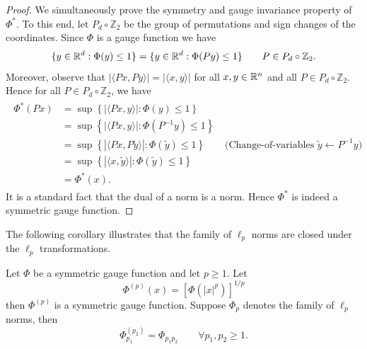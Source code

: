 \documentclass[sn-nature]{sn-jnl}%
\theoremstyle{thmstyleone}%
\theoremstyle{thmstyletwo}%
\theoremstyle{thmstylethree}%
\begin{document}
\begin{proof}
    We simultaneously prove the symmetry and gauge invariance property of $\Phi^*$. To this end, let $P_d \circ \mathbb{Z}_2$ be the group of permutations and sign changes of the coordinates.
    Since $\Phi$ is a gauge function we have
    \[
    \{y \in \mathbb{R}^d: \Phi(y) \leq 1\} = \{y \in \mathbb{R}^d: \Phi(Py) \leq 1\} \qquad P \in P_d \circ \mathbb{Z}_2.
    \]
    Moreover, observe that $| \langle Px, Py \rangle | = | \langle x, y \rangle |$ for all $x,y \in \mathbb{R}^n$ and all $P \in P_d \circ \mathbb{Z}_2$. Hence for all $P \in P_d \circ \mathbb{Z}_2$, we have 
    \begin{align*}
        \begin{split}
            \Phi^*(Px) &= \sup\left\{ |\langle Px, y \rangle| : \Phi(y) \leq 1 \right\}
            \\&= \sup \left\{ | \langle Px, y \rangle | : \Phi(P^{-1}y) \leq 1  \right\} 
            \\&= \sup \left\{ | \langle Px, P\tilde{y} \rangle | : \Phi(\tilde{y}) \leq 1  \right\} \qquad \text{(Change-of-variables $\tilde{y} \leftarrow P^{-1}y$)}
            \\&= \sup \left\{ | \langle x, \tilde{y} \rangle | : \Phi(\tilde{y}) \leq 1  \right\}
            \\ &= \Phi^*(x).
        \end{split}
    \end{align*}
    It is a standard fact that the dual of a norm is a norm. Hence $\Phi^*$ is indeed a symmetric gauge function. 
\end{proof}



The following corollary illustrates that the family of $\ell_p$ norms are closed under the $\ell_p$ transformations. 

 \begin{corollary}
    Let $\Phi$ be a symmetric gauge function and let $p \geq 1$. Let
$$
\Phi^{(p)}(x)=\left[\Phi\left(|x|^p\right)\right]^{1 / p} 
$$
then $\Phi^{(p)}$ is a symmetric gauge function.
Suppose $\Phi_p$ denotes the family of $\ell_p$ norms, then 
        \[
        \Phi_{p_1}^{(p_2)} = \Phi_{p_1 p_2} \qquad \forall p_1, p_2 \geq 1.
        \]
    \end{corollary}



\end{document}
